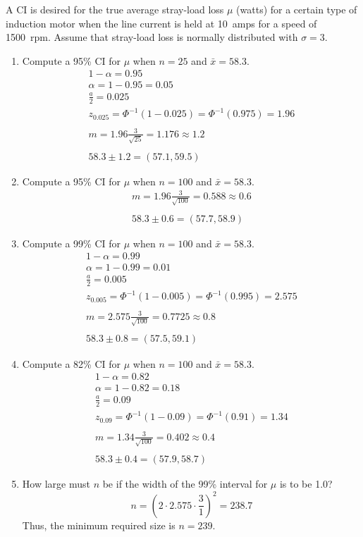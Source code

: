\documentclass[letterpaper,12pt,fleqn]{article}
\renewcommand{\a}{\alpha}
\newcommand{\m}{\mu}
\renewcommand{\o}{\sigma}
\renewcommand{\P}{\Phi}
\begin{document}
A CI is desired for the true average stray-load loss \(\m\) (watts) for a certain type of induction motor when the line
current is held at \SI{10}{amps} for a speed of \SI{1500}{rpm}.  Assume that stray-load loss is normally distributed with
\(\o=3\).
\begin{enumerate}[label={\alph*)}]
\item Compute a 95\% CI for \(\m\) when \(n=25\) and \(\bar{x}=58.3\).
  \begin{gather*}
    1-\a=0.95 \\
    \a=1-0.95=0.05 \\
    \frac{a}{2}=0.025 \\
    z_{0.025}=\P^{-1}(1-0.025)=\P^{-1}(0.975)=1.96 \\
    \\
    m=1.96\frac{3}{\sqrt{25}}=1.176\approx1.2 \\
    \\
    58.3\pm1.2=(57.1,59.5)
  \end{gather*}
\item Compute a 95\% CI for \(\m\) when \(n=100\) and \(\bar{x}=58.3\).
  \begin{gather*}
    m=1.96\frac{3}{\sqrt{100}}=0.588\approx0.6 \\
    \\
    58.3\pm0.6=(57.7,58.9)
  \end{gather*}
\item Compute a 99\% CI for \(\m\) when \(n=100\) and \(\bar{x}=58.3\).
  \begin{gather*}
    1-\a=0.99 \\
    \a=1-0.99=0.01 \\
    \frac{a}{2}=0.005 \\
    z_{0.005}=\P^{-1}(1-0.005)=\P^{-1}(0.995)=2.575 \\
    \\
    m=2.575\frac{3}{\sqrt{100}}=0.7725\approx0.8 \\
    \\
    58.3\pm0.8=(57.5,59.1)
  \end{gather*}
\item Compute a 82\% CI for \(\m\) when \(n=100\) and \(\bar{x}=58.3\).
  \begin{gather*}
    1-\a=0.82 \\
    \a=1-0.82=0.18 \\
    \frac{a}{2}=0.09 \\
    z_{0.09}=\P^{-1}(1-0.09)=\P^{-1}(0.91)=1.34 \\
    \\
    m=1.34\frac{3}{\sqrt{100}}=0.402\approx0.4 \\
    \\
    58.3\pm0.4=(57.9,58.7)
  \end{gather*}
\item How large must \(n\) be if the width of the 99\% interval for \(\m\) is to be 1.0?
  \[n=\left(2\cdot2.575\cdot\frac{3}{1}\right)^2=238.7\]
  Thus, the minimum required size is \(n=239\).
\end{enumerate}
\end{document}
